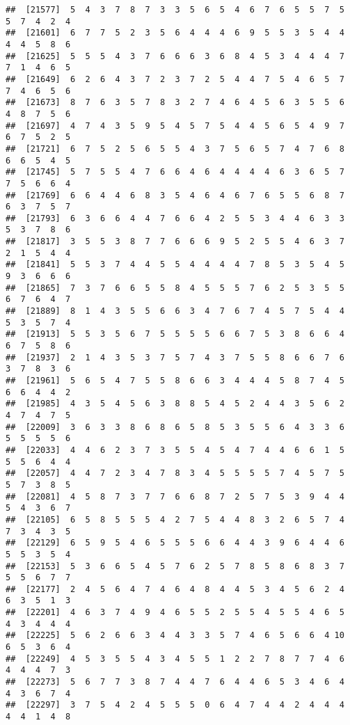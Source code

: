 \documentclass[
]{book}
\begin{document}
\begin{verbatim}
##  [21577]  5  4  3  7  8  7  3  3  5  6  5  4  6  7  6  5  5  7  5  5  7  4  2  4
##  [21601]  6  7  7  5  2  3  5  6  4  4  4  6  9  5  5  3  5  4  4  4  4  5  8  6
##  [21625]  5  5  5  4  3  7  6  6  6  3  6  8  4  5  3  4  4  4  7  7  1  4  6  5
##  [21649]  6  2  6  4  3  7  2  3  7  2  5  4  4  7  5  4  6  5  7  7  4  6  5  6
##  [21673]  8  7  6  3  5  7  8  3  2  7  4  6  4  5  6  3  5  5  6  4  8  7  5  6
##  [21697]  4  7  4  3  5  9  5  4  5  7  5  4  4  5  6  5  4  9  7  6  7  5  2  5
##  [21721]  6  7  5  2  5  6  5  5  4  3  7  5  6  5  7  4  7  6  8  6  6  5  4  5
##  [21745]  5  7  5  5  4  7  6  6  4  6  4  4  4  4  6  3  6  5  7  7  5  6  6  4
##  [21769]  6  6  4  4  6  8  3  5  4  6  4  6  7  6  5  5  6  8  7  6  3  7  5  7
##  [21793]  6  3  6  6  4  4  7  6  6  4  2  5  5  3  4  4  6  3  3  5  3  7  8  6
##  [21817]  3  5  5  3  8  7  7  6  6  6  9  5  2  5  5  4  6  3  7  2  1  5  4  4
##  [21841]  5  5  3  7  4  4  5  5  4  4  4  4  7  8  5  3  5  4  5  9  3  6  6  6
##  [21865]  7  3  7  6  6  5  5  8  4  5  5  5  7  6  2  5  3  5  5  6  7  6  4  7
##  [21889]  8  1  4  3  5  5  6  6  3  4  7  6  7  4  5  7  5  4  4  5  3  5  7  4
##  [21913]  5  5  3  5  6  7  5  5  5  5  6  6  7  5  3  8  6  6  4  6  7  5  8  6
##  [21937]  2  1  4  3  5  3  7  5  7  4  3  7  5  5  8  6  6  7  6  3  7  8  3  6
##  [21961]  5  6  5  4  7  5  5  8  6  6  3  4  4  4  5  8  7  4  5  6  6  4  4  2
##  [21985]  4  3  5  4  5  6  3  8  8  5  4  5  2  4  4  3  5  6  2  4  7  4  7  5
##  [22009]  3  6  3  3  8  6  8  6  5  8  5  3  5  5  6  4  3  3  6  5  5  5  5  6
##  [22033]  4  4  6  2  3  7  3  5  5  4  5  4  7  4  4  6  6  1  5  5  5  6  4  4
##  [22057]  4  4  7  2  3  4  7  8  3  4  5  5  5  5  7  4  5  7  5  5  7  3  8  5
##  [22081]  4  5  8  7  3  7  7  6  6  8  7  2  5  7  5  3  9  4  4  5  4  3  6  7
##  [22105]  6  5  8  5  5  5  4  2  7  5  4  4  8  3  2  6  5  7  4  7  3  4  3  5
##  [22129]  6  5  9  5  4  6  5  5  5  6  6  4  4  3  9  6  4  4  6  5  5  3  5  4
##  [22153]  5  3  6  6  5  4  5  7  6  2  5  7  8  5  8  6  8  3  7  5  5  6  7  7
##  [22177]  2  4  5  6  4  7  4  6  4  8  4  4  5  3  4  5  6  2  4  6  3  5  1  3
##  [22201]  4  6  3  7  4  9  4  6  5  5  2  5  5  4  5  5  4  6  5  4  3  4  4  4
##  [22225]  5  6  2  6  6  3  4  4  3  3  5  7  4  6  5  6  6  4 10  6  5  3  6  4
##  [22249]  4  5  3  5  5  4  3  4  5  5  1  2  2  7  8  7  7  4  6  4  4  4  7  3
##  [22273]  5  6  7  7  3  8  7  4  4  7  6  4  4  6  5  3  4  6  4  4  3  6  7  4
##  [22297]  3  7  5  4  2  4  5  5  5  0  6  4  7  4  4  2  4  4  4  4  4  1  4  8

\end{verbatim}
\end{document}
